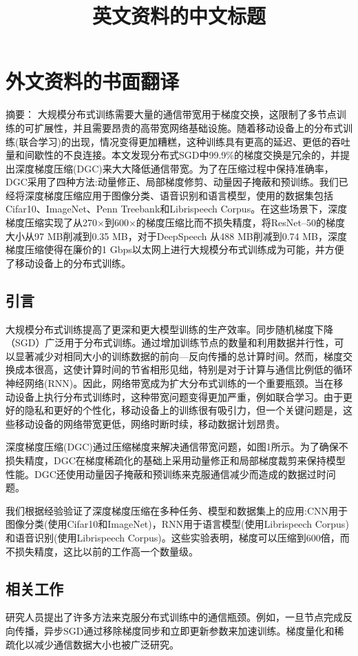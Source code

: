 \chapter{外文资料的书面翻译}

\title{英文资料的中文标题}

{\heiti 摘要：} 大规模分布式训练需要大量的通信带宽用于梯度交换，这限制了多节点训练的可扩展性，并且需要昂贵的高带宽网络基础设施。随着移动设备上的分布式训练(联合学习)的出现，情况变得更加糟糕，这种训练具有更高的延迟、更低的吞吐量和间歇性的不良连接。本文发现分布式SGD中99.9\%的梯度交换是冗余的，并提出深度梯度压缩(DGC)来大大降低通信带宽。为了在压缩过程中保持准确率，DGC采用了四种方法:动量修正、局部梯度修剪、动量因子掩蔽和预训练。我们已经将深度梯度压缩应用于图像分类、语音识别和语言模型，使用的数据集包括Cifar10、ImageNet、Penn Treebank和Librispeech Corpus。在这些场景下，深度梯度压缩实现了从270$\times$到600$\times$的梯度压缩比而不损失精度，将ResNet--50的梯度大小从97 MB削减到0.35 MB，对于DeepSpeech 从488 MB削减到0.74 MB，深度梯度压缩使得在廉价的1 Gbps以太网上进行大规模分布式训练成为可能，并方便了移动设备上的分布式训练。


\section{引言}
大规模分布式训练提高了更深和更大模型训练的生产效率。同步随机梯度下降（SGD）广泛用于分布式训练。通过增加训练节点的数量和利用数据并行性，可以显著减少对相同大小的训练数据的前向—反向传播的总计算时间。然而，梯度交换成本很高，这使计算时间的节省相形见绌，特别是对于计算与通信比例低的循环神经网络(RNN)。因此，网络带宽成为扩大分布式训练的一个重要瓶颈。当在移动设备上执行分布式训练时，这种带宽问题变得更加严重，例如联合学习。由于更好的隐私和更好的个性化，移动设备上的训练很有吸引力，但一个关键问题是，这些移动设备的网络带宽更低，网络时断时续，移动数据计划昂贵。

深度梯度压缩(DGC)通过压缩梯度来解决通信带宽问题，如图1所示。为了确保不损失精度，DGC在梯度稀疏化的基础上采用动量修正和局部梯度裁剪来保持模型性能。DGC还使用动量因子掩蔽和预训练来克服通信减少而造成的数据过时问题。

我们根据经验验证了深度梯度压缩在多种任务、模型和数据集上的应用:CNN用于图像分类(使用Cifar10和ImageNet)，RNN用于语言模型(使用Librispeech Corpus)和语音识别(使用Librispeech Corpus)。这些实验表明，梯度可以压缩到600倍，而不损失精度，这比以前的工作高一个数量级。

\section{相关工作}
研究人员提出了许多方法来克服分布式训练中的通信瓶颈。例如，一旦节点完成反向传播，异步SGD通过移除梯度同步和立即更新参数来加速训练。梯度量化和稀疏化以减少通信数据大小也被广泛研究。

